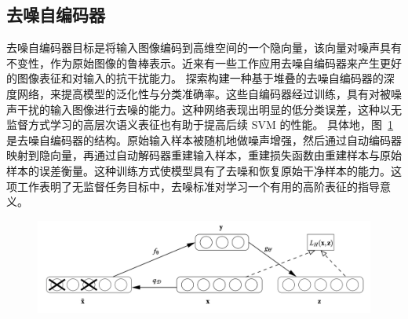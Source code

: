 \subsection{去噪自编码器} \label{sec:rel_dae}
去噪自编码器目标是将输入图像编码到高维空间的一个隐向量，该向量对噪声具有不变性，作为原始图像的鲁棒表示。近来有一些工作应用去噪自编码器来产生更好的图像表征和对输入的抗干扰能力。
\citet{vincent2010stacked} 探索构建一种基于堆叠的去噪自编码器的深度网络，来提高模型的泛化性与分类准确率。这些自编码器经过训练，具有对被噪声干扰的输入图像进行去噪的能力。这种网络表现出明显的低分类误差，这种以无监督方式学习的高层次语义表征也有助于提高后续 SVM 的性能。
具体地，图~\ref{c2_fig10}是去噪自编码器的结构。原始输入样本被随机地做噪声增强，然后通过自动编码器映射到隐向量，再通过自动解码器重建输入样本，重建损失函数由重建样本与原始样本的误差衡量。这种训练方式使模型具有了去噪和恢复原始干净样本的能力。这项工作表明了无监督任务目标中，去噪标准对学习一个有用的高阶表征的指导意义。
    \begin{figure}[tbp]
        \centering 
        \includegraphics[width=1.0\textwidth]{img/c2/rel_b4.png}
        \label{c2_fig10}
    \end{figure}

